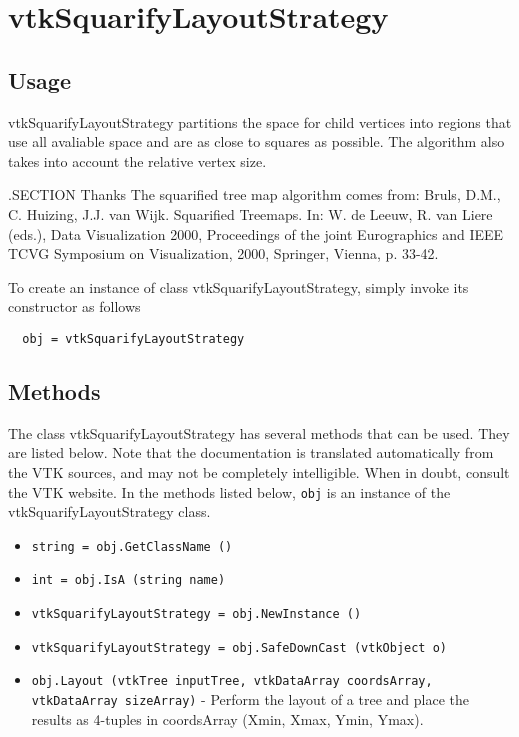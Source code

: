 \section{vtkSquarifyLayoutStrategy}

\subsection{Usage}

 vtkSquarifyLayoutStrategy partitions the space for child vertices into regions
 that use all avaliable space and are as close to squares as possible.
 The algorithm also takes into account the relative vertex size.

 .SECTION Thanks
 The squarified tree map algorithm comes from:
 Bruls, D.M., C. Huizing, J.J. van Wijk. Squarified Treemaps.
 In: W. de Leeuw, R. van Liere (eds.), Data Visualization 2000, 
 Proceedings of the joint Eurographics and IEEE TCVG Symposium on Visualization, 
 2000, Springer, Vienna, p. 33-42.

To create an instance of class vtkSquarifyLayoutStrategy, simply
invoke its constructor as follows
\begin{verbatim}
  obj = vtkSquarifyLayoutStrategy
\end{verbatim}
\subsection{Methods}

The class vtkSquarifyLayoutStrategy has several methods that can be used.
  They are listed below.
Note that the documentation is translated automatically from the VTK sources,
and may not be completely intelligible.  When in doubt, consult the VTK website.
In the methods listed below, \verb|obj| is an instance of the vtkSquarifyLayoutStrategy class.
\begin{itemize}
\item  \verb|string = obj.GetClassName ()|

\item  \verb|int = obj.IsA (string name)|

\item  \verb|vtkSquarifyLayoutStrategy = obj.NewInstance ()|

\item  \verb|vtkSquarifyLayoutStrategy = obj.SafeDownCast (vtkObject o)|

\item  \verb|obj.Layout (vtkTree inputTree, vtkDataArray coordsArray, vtkDataArray sizeArray)| -  Perform the layout of a tree and place the results as 4-tuples in
 coordsArray (Xmin, Xmax, Ymin, Ymax).

\end{itemize}
